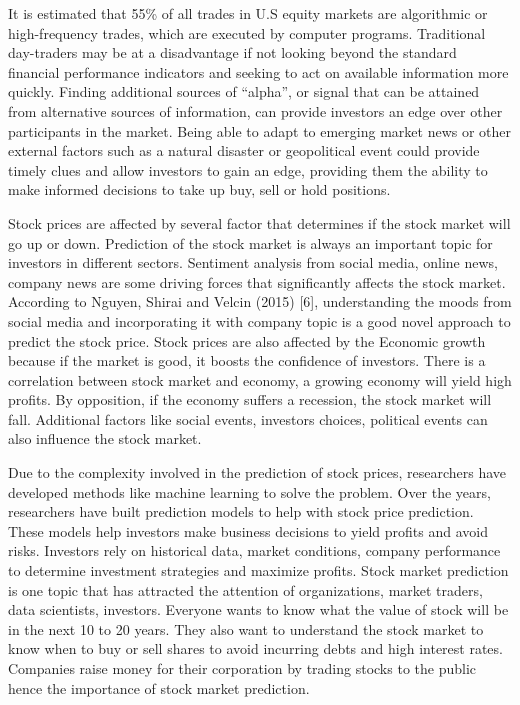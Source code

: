 \documentclass{llncs}
\begin{document}
It is estimated that 55\% of all trades in U.S equity markets are algorithmic or high-frequency trades, which are executed by computer programs. Traditional day-traders may be at a disadvantage if not looking beyond the standard financial performance indicators and seeking to act on available information more quickly. Finding additional sources of “alpha”, or signal that can be attained from alternative sources of information, can provide investors an edge over other participants in the market. Being able to adapt to emerging market news or other external factors such as a natural disaster or geopolitical event could provide timely clues and allow investors to gain an edge, providing them the ability to make informed decisions to take up buy, sell or hold positions.

Stock prices are affected by several factor that determines if the stock market will go up or down. Prediction of the stock market is always an important topic for investors in different sectors. Sentiment analysis from social media, online news, company news are some driving forces that significantly affects the stock market. According to Nguyen, Shirai and Velcin (2015) [6], understanding the moods from social media and incorporating it with company topic is a good novel approach to predict the stock price. Stock prices are also affected by the Economic growth because if the market is good, it boosts the confidence of investors.  There is a correlation between stock market and economy, a growing economy will yield high profits. By opposition, if the economy suffers a recession, the stock market will fall. Additional factors like social events, investors choices, political events can also influence the stock market.

Due to the complexity involved in the prediction of stock prices, researchers have developed methods like machine learning to solve the problem. Over the years, researchers have built prediction models to help with stock price prediction. These models help investors make business decisions to yield profits and avoid risks. Investors rely on historical data, market conditions, company performance to determine investment strategies and maximize profits. Stock market prediction is one topic that has attracted the attention of organizations, market traders, data scientists, investors. Everyone wants to know what the value of stock will be in the next 10 to 20 years.  They also want to understand the stock market to know when to buy or sell shares to avoid incurring debts and high interest rates. Companies raise money for their corporation by trading stocks to the public hence the importance of stock market prediction.
\end{document}
